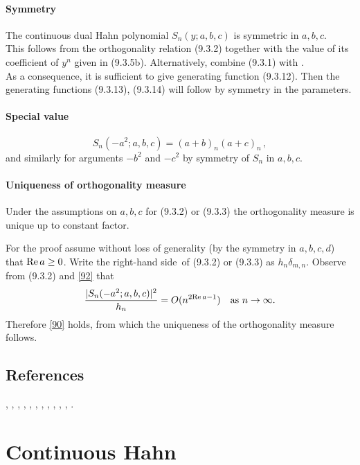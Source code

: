 \documentclass[envcountchap,graybox]{svmono}
\newcounter{rom}
\newcommand\de\delta
\newcommand\iy\infty
\newcommand\RHS{right-hand side}
\renewcommand\Re{{\rm Re}\,}
\begin{document}
\paragraph{Symmetry}
The continuous dual Hahn polynomial $S_n(y;a,b,c)$ is symmetric
in $a,b,c$.\\
This follows from the orthogonality relation (9.3.2)
together with the value of its coefficient of $y^n$ given in (9.3.5b).
Alternatively, combine (9.3.1) with .\\
As a consequence, it is sufficient to give generating function (9.3.12). Then the generating
functions (9.3.13), (9.3.14) will follow by symmetry in the parameters.
%
\paragraph{Special value}
\begin{equation}
S_n(-a^2;a,b,c)=(a+b)_n(a+c)_n\,,
\label{92}
\end{equation}
and similarly for arguments $-b^2$ and $-c^2$ by symmetry of $S_n$ in $a,b,c$.
%
\paragraph{Uniqueness of orthogonality measure}
Under the assumptions on $a,b,c$ for (9.3.2) or (9.3.3) the orthogonality
measure is unique up to constant factor.

For the proof assume without
loss of generality (by the symmetry in $a,b,c,d$) that $\Re a\geq0$.
Write the \RHS\ of (9.3.2) or (9.3.3) as $h_n\de_{m,n}$.
Observe from (9.3.2) and \eqref{92} that
\[
\frac{|S_n(-a^2;a,b,c)|^2}{h_n} = O(n^{2\Re a-1})\quad
\hbox{as $n\to\iy$.}
\]
Therefore \eqref{90} holds, from which the uniqueness of the orthogonality
measure follows.
%

\subsection*{References}
\cite{AskeyWilson85}, \cite{IsmailLetVal89}, \cite{Koorn85}, \cite{Koorn88},
\cite{Lesky94II}, \cite{Lesky95I}, \cite{Lesky95II}, \cite{Letessier84},
\cite{Letessier86}, \cite{MimachiII}, \cite{Neuman}, \cite{ValentAssche}.


\section{Continuous Hahn}
\end{document}
